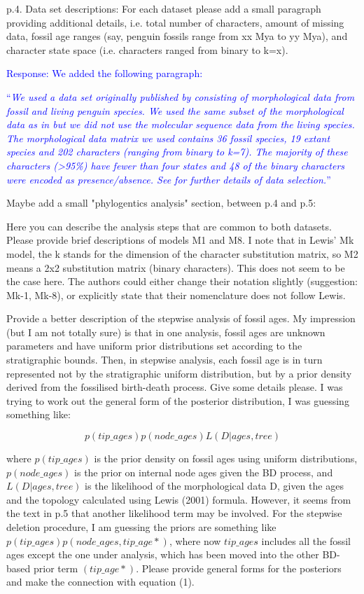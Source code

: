 \documentclass[11pt]{article}
\newcommand{\response}[1]{\medskip{}\textcolor{blue}{{Response: #1}}\medskip{}}
\newcommand{\respquote}[1]{\medskip{}\textcolor{blue}{``{\it #1}''}\medskip{}}
\begin{document}
p.4. Data set descriptions: For each dataset please add a small paragraph providing additional details, i.e. total number of characters, amount of missing data, fossil age ranges (say, penguin fossils range from xx Mya to yy Mya), and character state space (i.e. characters ranged from binary to k=x).

\response{We added the following paragraph:}

\respquote{We used a data set originally published by \cite{ksepka2012} consisting of morphological data from fossil and living penguin 
species. 
We used the same subset of the morphological data as in \cite{gavryushkina2015bayesian} but we did not use the molecular sequence data from the living species. 
The morphological data matrix we used contains 36 fossil species, 19 extant species and 202 characters (ranging from binary to k=7). 
The majority of these characters (\textgreater 95\%) have fewer than four states and 48 of the binary characters were encoded as presence/absence. 
See \cite{gavryushkina2015bayesian} for further details of data selection.}

Maybe add a small "phylogentics analysis" section, between p.4 and p.5: 

Here you can describe the analysis steps that are common to both datasets. Please provide brief descriptions of models M1 and M8. I note that in Lewis' Mk model, the k stands for the dimension of the character substitution matrix, so M2 means a 2x2 substitution matrix (binary characters). This does not seem to be the case here. The authors could either change their notation slightly (suggestion: Mk-1, Mk-8), or explicitly state that their nomenclature does not follow Lewis. 

Provide a better description of the stepwise analysis of fossil ages. My impression (but I am not totally sure) is that in one analysis, fossil ages are unknown parameters and have uniform prior distributions set according to the stratigraphic bounds. Then, in stepwise analysis, each fossil age is in turn represented not by the stratigraphic uniform distribution, but by a prior density derived from the fossilised birth-death process. Give some details please. I was trying to work out the general form of the posterior distribution, I was guessing something like:

$$p(tip\_ages) p(node\_ages) L(D|ages,tree)$$

where $p(tip\_ages)$ is the prior density on fossil ages using uniform distributions, $p(node\_ages)$ is the prior on internal node ages given the BD process, and $L(D|ages,tree)$ is the likelihood of the morphological data D, given the ages and the topology calculated using Lewis (2001) formula. However, it seems from the text in p.5 that another likelihood term may be involved. For the stepwise deletion procedure, I am guessing the priors are something like $p(tip\_ages\hat{}) p(node\_ages, tip\_age*)$, where now $tip\_ages\hat{}$ includes all the fossil ages except the one under analysis, which has been moved into the other BD-based prior term $(tip\_age*)$. Please provide general forms for the posteriors and make the connection with equation (1).
\end{document}
